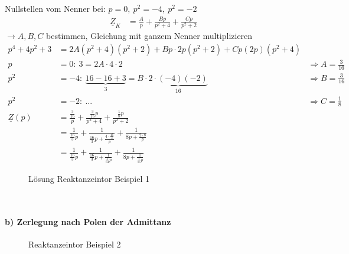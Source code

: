 Nullstellen vom Nenner bei: $p=0,\ p^2=-4,\ p^2=-2$\\
\begin{align}
\underline{Z}_K&=\frac{A}{p}+\frac{Bp}{p^2+4}+\frac{Cp}{p^2+2}\nonumber
\end{align}
$\rightarrow A,B,C$ bestimmen, Gleichung mit ganzem Nenner multiplizieren\\
\begin{align}
p^4+4p^2+3&=2A(p^2+4)(p^2+2)+Bp\cdot 2p(p^2+2)+Cp(2p)(p^2+4)\nonumber\\
p&=0:\ 3=2A\cdot 4 \cdot 2 &\Rightarrow A=\frac{3}{16}\nonumber\\
p^2&=-4:\ \underbrace{16-16+3}_{3}=B\cdot \underbrace{2\cdot (-4)(-2)}_{16}
&\Rightarrow B=\frac{3}{16}\nonumber\\ 
p^2&=-2:\ ... &\Rightarrow C=\frac{1}{8}\nonumber\\
\underline{Z}(p)&=\frac{\frac{3}{16}}{p}+\frac{\frac{3}{16}p}{p^2+4}+\frac{\frac{1}{8}p}{p^2+2}\nonumber\\
&=\frac{1}{\frac{16}{3}p}+\frac{1}{\frac{16}{3}p+\frac{4\cdot\frac{16}{3}}{p}}+\frac{1}{8p+\frac{2\cdot8}{p}}\nonumber\\
&=\frac{1}{\frac{16}{3}p}+\frac{1}{\frac{16}{3}p+\frac{1}{\frac{3}{64}p}}+\frac{1}{8p+\frac{1}{\frac{1}{16}p}}\nonumber
\end{align}
\begin{figure}[!h]
	\centering
	
	\caption{Lösung Reaktanzeintor Beispiel 1}
	\label{fig:RetSyntheseBsp1SL}
\end{figure}\\


\paragraph{b) Zerlegung nach Polen der Admittanz}
\begin{figure}[!ht]
	\centering
	
	\caption{Reaktanzeintor Beispiel 2}
	\label{fig:RetSyntheseBsp2}
\end{figure}

